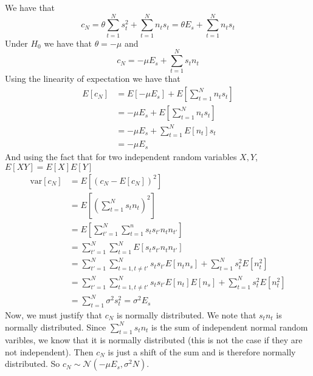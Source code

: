 \documentclass[a4paper]{article}
\begin{document}
We have that
\[
  c_N = \theta \sum_{t=1}^N s_t^2 + \sum_{t=1}^N n_ts_t = \theta E_s + \sum_{t=1}^N n_ts_t
\]
Under $H_0$ we have that $\theta = -\mu$ and 
\[
  c_N = -\mu  E_s + \sum_{t=1}^N s_tn_t
\]
Using the linearity of expectation we have that
\[
  \begin{aligned}
    E[c_N] &= E[-\mu E_s] + E \left[ \sum_{t=1}^N n_ts_t \right]\\
    &= -\mu E_s + E \left[ \sum_{t=1}^N n_ts_t \right]\\
    &= -\mu E_s + \sum_{t=1}^N E[n_t]s_t\\
    &= -\mu E_s
  \end{aligned}
\]
And using the fact that for two independent random variables $X,Y$, $E[XY] = E[X]E[Y]$
\[
  \begin{aligned}
    \text{var} [c_N] &= E \left[ \left( c_N - E[c_N] \right)^2 \right] \\
                     &= E \left[ \left( \sum_{t=1}^N s_tn_t \right)^2 \right] \\
                     &= E \left[ \sum_{t' = 1}^N \sum_{t = 1}^n s_ts_{t'} n_t n_{t'} \right] \\
                     &= \sum_{t' = 1}^N \sum_{t = 1}^N E[s_ts_{t'}n_tn_{t'}] \\
                     &= \sum_{t' = 1}^N \sum_{t=1, t \neq t'}^N s_ts_{t'}E[n_tn_s] + \sum_{t=1}^N s_t^2E[n_t^2] \\
                     &= \sum_{t' = 1}^N \sum_{t=1, t \neq t'}^N s_ts_{t'}E[n_t]E[n_s] + \sum_{t=1}^N s_t^2E[n_t^2] \\
                     &= \sum_{t=1}^N \sigma^2s_t^2 = \sigma^2 E_s
  \end{aligned}
\]
Now, we must justify that $c_N$ is normally distributed. We note that $s_tn_t$ is normally distributed. Since $\sum_{t=1}^N s_tn_t$ is the sum of independent normal random varibles, we know that it is normally distributed (this is not the case if they are not independent). Then $c_N$ is just a shift of the sum and is therefore normally distributed. So $c_N \sim \mathcal{N}(-\mu E_s, \sigma^2N)$.
\end{document}
